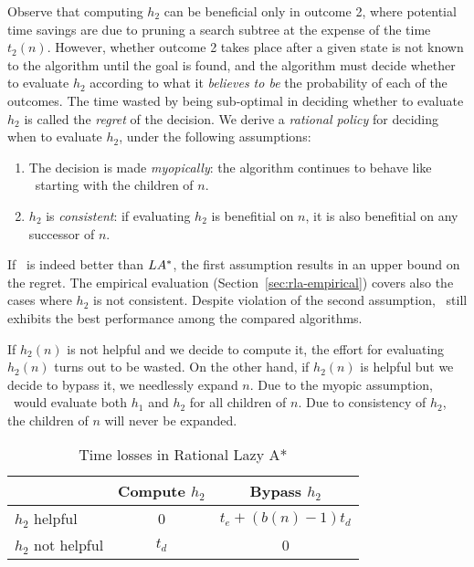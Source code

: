 Observe that computing $h_2$ can be beneficial only in outcome 2,
where potential time savings are due to pruning a search subtree at
the expense of the time $t_2(n)$. However, whether outcome 2 takes
place after a given state is not known to the algorithm until the goal
is found, and the algorithm must decide whether to evaluate $h_2$
according to what it \textit{believes to be} the probability of each
of the outcomes. The time wasted by being sub-optimal in deciding
whether to evaluate $h_2$ is called the {\em regret} of the decision.
We derive a \textit{rational policy} for deciding when to evaluate
$h_2$, under the following assumptions:
\begin{enumerate}
\item The decision is made \textit{myopically}: the algorithm continues to
  behave like \lazyastar~starting with the children of
  $n$.
\item $h_2$ is \textit{consistent}: if evaluating $h_2$ is benefitial
  on $n$, it is also benefitial on any successor of $n$.
\end{enumerate}
If \rationallazyastar~is indeed better than $LA^\ast$, the
first assumption results in an upper bound on the regret. The empirical
evaluation (Section~\ref{sec:rla-empirical}) covers also the cases
where $h_2$ is not consistent. Despite violation of the second assumption,
\rationallazyastar~still exhibits the best performance among
the compared algorithms.

If $h_2(n)$ is not helpful and we decide to compute it, the effort for evaluating
$h_2(n)$ turns out to be wasted. On the other hand, if $h_2(n)$ is
helpful but we decide to bypass it, we needlessly expand $n$. Due to
the myopic assumption, \rationallazyastar~would evaluate both $h_1$
and $h_2$ for all children of $n$. Due to consistency of $h_2$,
the children of $n$ will never be expanded.
\begin{table}[h!]
\begin{center}
\begin{tabular}{|l|c|c|}
\hline
               & Compute $h_2$ & Bypass $h_2$\\
\hline
$h_2$ helpful &   0            & $t_e+(b(n)-1)t_d$\\
\hline
$h_2$ not helpful & $t_d$      & 0 \\
\hline
\end{tabular}
\end{center}
\caption{Time losses in Rational Lazy A*}
\label{tbl:rla-rational-lazy-a-time}
\end{table}

